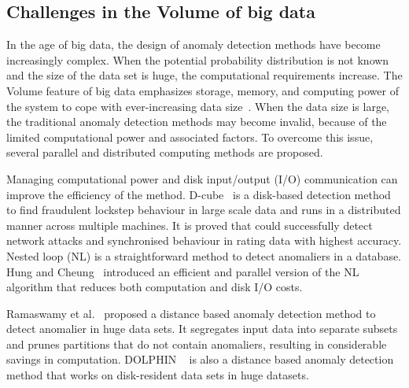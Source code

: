 \subsection{Challenges in the Volume of big data}

In the age of big data,
the design of anomaly detection methods have become increasingly complex.
When the potential probability distribution is not
known and the size of the data set is huge,
the computational requirements increase.
The Volume feature of big data emphasizes storage,
memory,
and computing power of the system to
cope with ever-increasing data size~\cite{gadepally2014big}.
When the data size is large,
the traditional anomaly detection methods may become invalid,
because of the limited computational power and associated factors.
To overcome this issue,
several parallel and distributed computing methods are proposed.

Managing computational power and disk input/output (I/O) communication can
improve the efficiency of the method.
D-cube~\cite{shin2017d} is a disk-based detection method to
find fraudulent lockstep behaviour in large scale data and
runs in a distributed manner across multiple machines.
It is proved that could successfully
detect network attacks and
synchronised behaviour in rating data
with highest accuracy.
Nested loop (NL)\cite{knox1998algorithms} is
a straightforward method to detect anomaliers in a database.
Hung and Cheung~\cite{hung2002parallel} introduced an
efficient and parallel version
of the NL algorithm that reduces both computation and disk I/O costs.

Ramaswamy et al.~\cite{ramaswamy2000efficient} proposed a
distance based  anomaly detection method to detect anomalier in huge data sets.
It segregates input data into
separate subsets and prunes partitions that
do not contain anomaliers,
resulting in considerable
savings in computation.
DOLPHIN ~\cite{angiulli2007very} is also a
distance based anomaly detection method
that works on disk-resident data sets in huge datasets.

